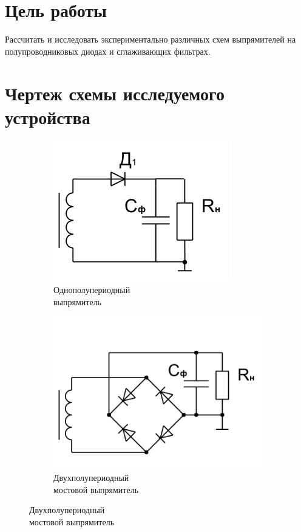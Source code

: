 





\section{Цель работы}

Рассчитать и исследовать экспериментально различных схем выпрямителей на полупроводниковых диодах и сглаживающих фильтрах.

\section{Чертеж схемы исследуемого устройства}

\begin{figure}[h]
\centering
\begin{subfigure}[b]{0.35\textwidth}
\includegraphics[scale=0.85]{diod.png}
\caption{Однополупериодный \\выпрямитель}\label{figure:2.1:a}
\end{subfigure}
\begin{subfigure}[b]{0.35\textwidth}
\includegraphics[scale=0.5]{4diods.png}
\caption{Двухполупериодный \\мостовой выпрямитель}\label{figure:2.1:b}
\end{subfigure}
\end{figure}

